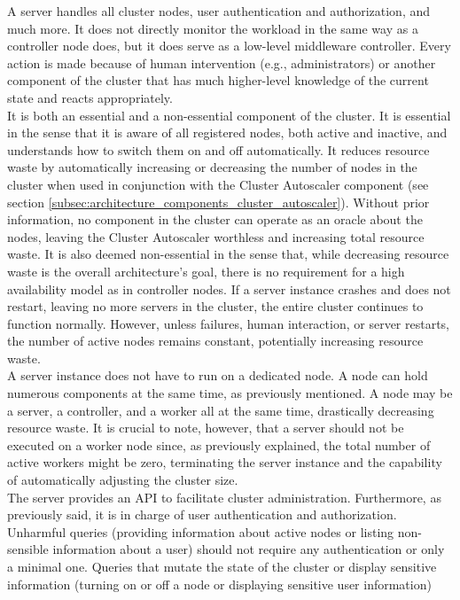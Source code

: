A server handles all cluster nodes, user authentication and authorization, and much
more. It does not directly monitor the workload in the same way as a controller
node does, but it does serve as a low-level middleware controller. Every action
is made because of human intervention (e.g., administrators) or another
component of the cluster that has much higher-level knowledge of the current
state and reacts appropriately. \\ %
It is both an essential and a non-essential component of the cluster. It is essential
in the sense that it is aware of all registered nodes, both active and inactive,
and understands how to switch them on and off automatically. It reduces resource
waste by automatically increasing or decreasing the number of nodes in the
cluster when used in conjunction with the Cluster Autoscaler component (see section
\ref{subsec:architecture_components_cluster_autoscaler}). Without prior information,
no component in the cluster can operate as an oracle about the nodes, leaving the
Cluster Autoscaler worthless and increasing total resource waste. It is also
deemed non-essential in the sense that, while decreasing resource waste is the overall
architecture's goal, there is no requirement for a high availability model as in
controller nodes. If a server instance crashes and does not restart, leaving no
more servers in the cluster, the entire cluster continues to function normally.
However, unless failures, human interaction, or server restarts, the number of
active nodes remains constant, potentially increasing resource waste. \\ %
A server instance does not have to run on a dedicated node. A node can hold
numerous components at the same time, as previously mentioned. A node may be a
server, a controller, and a worker all at the same time, drastically decreasing resource
waste. It is crucial to note, however, that a server should not be executed on a
worker node since, as previously explained, the total number of active workers
might be zero, terminating the server instance and the capability of automatically
adjusting the cluster size. \\ %
The server provides an API to facilitate cluster administration. Furthermore, as
previously said, it is in charge of user authentication and authorization. Unharmful
queries (providing information about active nodes or listing non-sensible
information about a user) should not require any authentication or only a minimal
one. Queries that mutate the state of the cluster or display sensitive
information (turning on or off a node or displaying sensitive user information)
